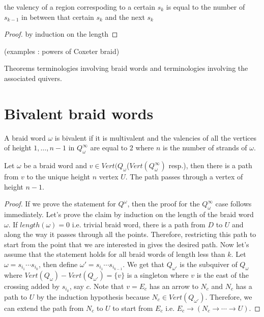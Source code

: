 \begin{lemma}
	the valency of a region correspoding to a certain $s_k$ is equal to the number of $s_{k-1}$ in between that certain $s_k$ and the next $s_k$
\end{lemma}
\begin{proof}
by induction on the length
\end{proof}

(examples : powers of Coxeter braid)

\begin{theorem}
Theorems terminologies involving braid words and terminologies involving the associated quivers.
\end{theorem}


\section{Bivalent braid words}                          
\begin{definition}
	 A braid word $\omega$ is bivalent if it is multivalent and the valencies of all the vertices of height $1,\dots,n-1$ in $Q_\omega^\infty$ are equal to $2$ where $n$ is the number of strands of $\omega$. 
\end{definition}
\begin{lemma}
Let $\omega$ be a braid word and $v\in Vert(Q_\omega$($Vert(Q_\omega^\infty)$ resp.), then there is a path from $v$ to the unique height $n$ vertex $U$. The path passes through a vertex of height $n-1$.
\end{lemma}
\begin{proof}
If we prove the statement for $Q^\omega$, then the proof for the $Q_\omega^\infty$ case follows immediately. Let's prove the claim by induction on the length of the braid word $\omega$. If $length(\omega) = 0$ i.e. trivial braid word, there is a path from $D$ to $U$ and along the way it passes through all the points. Therefore, restricting this path to start from the point that we are interested in gives the desired path. Now let's assume that the statement holds for all braid words of length less than $k$. Let $\omega = s_{i_1}\cdots s_{i_k}$, then define $\omega' = s_{i_1}\cdots s_{i_{k-1}}$. We get that $Q_{\omega'}$ is the subquiver of $Q_\omega$ where $Vert(Q_\omega) - Vert(Q_{\omega'}) = \{v\}$ is a singleton where $v$ is the east of the crossing added by $s_{i_k}$, say $c$. Note that $v=E_c$ has an arrow to $N_c$ and $N_c$ has a path to $U$ by the induction hypothesis because $N_c \in Vert(Q_{\omega'})$. Therefore, we can extend the path from $N_c$ to $U$ to start from $E_c$ i.e. $E_c\rightarrow (N_c\rightarrow \cdots \rightarrow U)$.
\end{proof}

